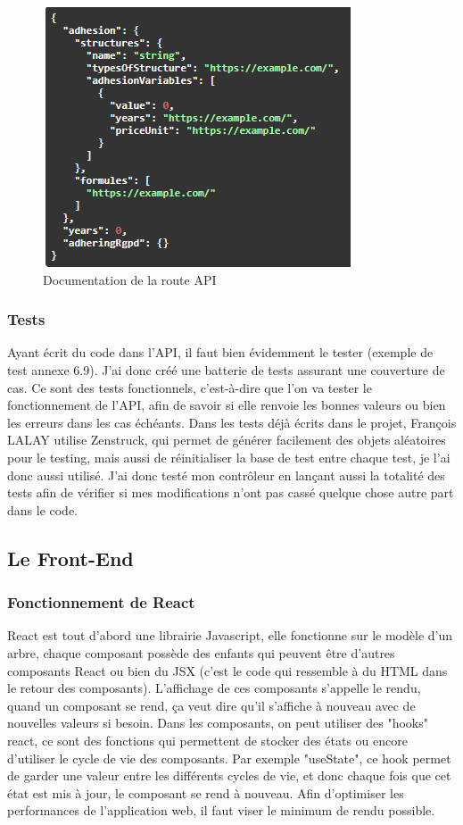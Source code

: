 \documentclass[a4paper,12pt]{report}
\begin{document}
\begin{figure}[ht]
    \centering
    \includegraphics[scale=0.8]{docSimulatorInput.png}
    \caption{Documentation de la route API}
    \label{fig:swagger-simulator-in}
\end{figure}


\subsubsection{Tests}
Ayant écrit du code dans l'API, il faut bien évidemment le tester (exemple de test annexe 6.9). J'ai donc créé une batterie de tests assurant une couverture de cas. Ce sont des tests fonctionnels, c'est-à-dire que l'on va tester le fonctionnement de l'API, afin de savoir si elle renvoie les bonnes valeurs ou bien les erreurs dans les cas échéants. Dans les tests déjà écrits dans le projet, François LALAY utilise Zenstruck, qui permet de générer facilement des objets aléatoires pour le testing, mais aussi de réinitialiser la base de test entre chaque test, je l'ai donc aussi utilisé. J'ai donc testé mon contrôleur en lançant aussi la totalité des tests afin de vérifier si mes modifications n'ont pas cassé quelque chose autre part dans le code.

\subsection{Le Front-End}

\subsubsection{Fonctionnement de React}
React est tout d'abord une librairie Javascript, elle fonctionne sur le modèle d'un arbre, chaque composant possède des enfants qui peuvent être d'autres composants React ou bien du JSX (c'est le code qui ressemble à du HTML dans le retour des composants). L'affichage de ces composants s'appelle le rendu, quand un composant se rend, ça veut dire qu'il s'affiche à nouveau avec de nouvelles valeurs si besoin. Dans les composants, on peut utiliser des "hooks" react, ce sont des fonctions qui permettent de stocker des états ou encore d'utiliser le cycle de vie des composants. Par exemple "useState", ce hook permet de garder une valeur entre les différents cycles de vie, et donc chaque fois que cet état est mis à jour, le composant se rend à nouveau. Afin d'optimiser les performances de l'application web, il faut viser le minimum de rendu possible.
\end{document}
